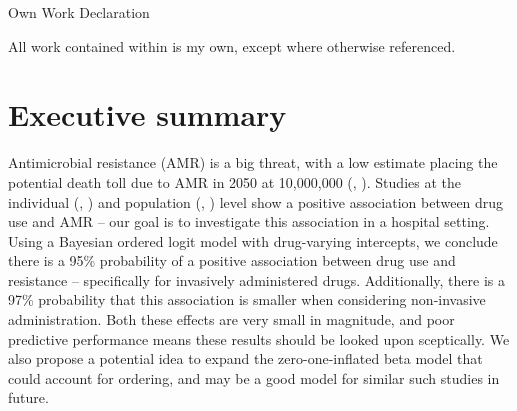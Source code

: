 \documentclass[11pt,twoside]{article}
\numberwithin{Theorem}{section}
\numberwithin{Definition}{section}
\numberwithin{Lemma}{section}
\numberwithin{Algorithm}{section}
\numberwithin{equation}{section}
\begin{document}


\flushleft


\begin{center}
	\Large{Own Work Declaration}
\end{center}

All work contained within is my own, except where otherwise referenced. 

\cleardoublepage



\pagestyle{plain}
\setcounter{page}{1}

\cleardoublepage

\setcounter{page}{1}

\tableofcontents


\clearpage

\section*{Executive summary}
\label{sec.exec}

Antimicrobial resistance (AMR) is a big threat, with a low estimate placing the potential death toll due to AMR in 2050 at 10,000,000 (\citeauthor{ONeill2016}, \citeyear{ONeill2016}). Studies at the individual (\citeauthor{Costelloe2010}, \citeyear{Costelloe2010}) and population (\citeauthor{Goossens2005}, \citeyear{Goossens2005}) level show a positive association between drug use and AMR -- our goal is to investigate this association in a hospital setting. Using a Bayesian ordered logit model with drug-varying intercepts, we conclude there is a 95\% probability of a positive association between drug use and resistance -- specifically for invasively administered drugs. Additionally, there is a 97\% probability that this association is smaller when considering non-invasive administration. Both these effects are very small in magnitude, and poor predictive performance means these results should be looked upon sceptically. We also propose a potential idea to expand the zero-one-inflated beta model that could account for ordering, and may be a good model for similar such studies in future. 
\end{document}
